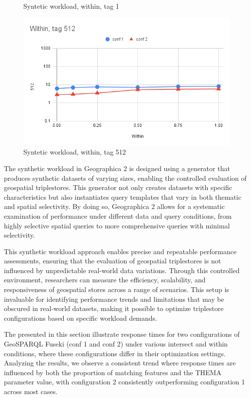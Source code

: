 \begin{figure}[h!tb]
\begin{multicols}{2}
    \caption{Syntetic workload, within, tag 1}\label{fig:within1}\par
    \includegraphics[width=\linewidth]{img/Within-tag-512.png}
    \caption{Syntetic workload, within, tag 512}\label{fig:within512}\par
\end{multicols}
\end{figure}


The synthetic workload in Geographica 2 is designed using a generator that produces synthetic datasets of varying sizes, enabling the controlled evaluation of geospatial triplestores. This generator not only creates datasets with specific characteristics but also instantiates query templates that vary in both thematic and spatial selectivity. By doing so, Geographica 2 allows for a systematic examination of performance under different data and query conditions, from highly selective spatial queries to more comprehensive queries with minimal selectivity. 

This synthetic workload approach enables precise and repeatable performance assessments, ensuring that the evaluation of geospatial triplestores is not influenced by unpredictable real-world data variations. Through this controlled environment, researchers can measure the efficiency, scalability, and responsiveness of geospatial stores across a range of scenarios. This setup is invaluable for identifying performance trends and limitations that may be obscured in real-world datasets, making it possible to optimize triplestore configurations based on specific workload demands.

The  presented in this section illustrate response times for two configurations of GeoSPARQL Fuseki (conf 1 and conf 2) under various intersect and within conditions, where these configurations differ in their optimization settings. Analyzing the results, we observe a consistent trend where response times are influenced by both the proportion of matching features and the THEMA parameter value, with configuration 2 consistently outperforming configuration 1 across most cases.

